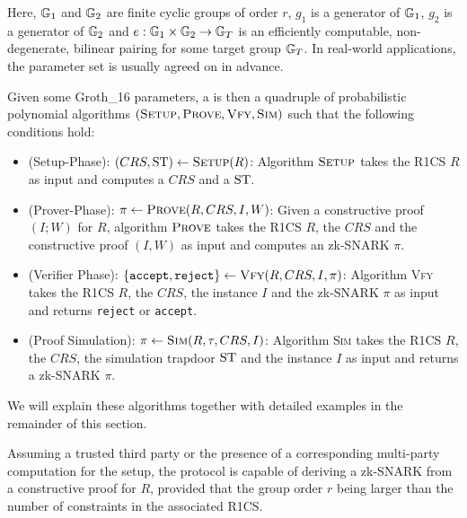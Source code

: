 Here, $\mathbb{G}_1$ and $\mathbb{G}_2$ are finite cyclic groups of order $r$, $g_1$ is a generator of $\mathbb{G}_1$, $g_2$ is a generator of $\mathbb{G}_2$ and $e: \mathbb{G}_1 \times \mathbb{G}_2 \to \mathbb{G}_T$ is an efficiently computable, non-degenerate, bilinear pairing for some target group $\mathbb{G}_T$. In real-world applications, the parameter set is usually agreed on in advance. 

Given some Groth\_16 parameters, a  is then a quadruple of probabilistic polynomial algorithms $(\textsc{Setup},\textsc{Prove},\textsc{Vfy},\textsc{Sim})$ such that the following conditions hold:
\begin{itemize}
\item (Setup-Phase): $(CRS,\mathrm{ST})\leftarrow \textsc{Setup}(R)$: Algorithm $\textsc{Setup}$ takes the R1CS $R$ as input and computes a  $CRS$ and a  $\mathrm{ST}$.
\item (Prover-Phase): $\pi\leftarrow \textsc{Prove}(R,CRS,I,W)$: Given a constructive proof $(I;W)$ for $R$, algorithm $\textsc{Prove}$ takes the R1CS $R$, the  $CRS$ and the constructive proof $(I,W)$ as input and computes an zk-SNARK $\pi$.
\item (Verifier Phase): $\{\mathtt{accept},\mathtt{reject}\}\leftarrow \textsc{Vfy}(R,CRS,I,\pi)$:   Algorithm \textsc{Vfy} takes the R1CS $R$, the  $CRS$, the instance $I$ and the zk-SNARK $\pi$ as input and returns \texttt{reject} or \texttt{accept}.
\item (Proof Simulation): $\pi\leftarrow \textsc{Sim}(R,\tau,CRS, I)$: Algorithm \textsc{Sim} takes the R1CS $R$, the  $CRS$, the simulation trapdoor $\mathrm{ST}$ and the instance $I$ as input and returns a zk-SNARK $\pi$. 
\end{itemize}
We will explain these algorithms together with detailed examples in the remainder of this section.

Assuming a trusted third party or the presence of a corresponding multi-party computation for the setup, the protocol is capable of deriving a zk-SNARK from a constructive proof for $R$, provided that the group order $r$ being larger than the number of constraints in the associated R1CS.

